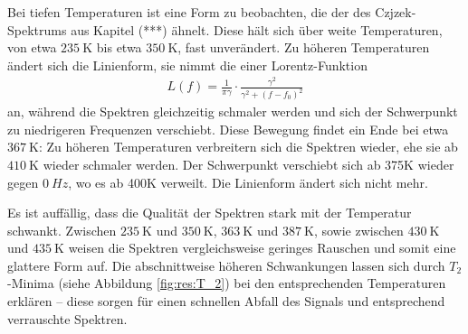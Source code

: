 Bei tiefen Temperaturen ist eine Form zu beobachten, die der des Czjzek-Spektrums aus Kapitel (***) ähnelt. Diese hält sich über weite Temperaturen, von etwa $\SI{235}{\kelvin}$ bis etwa $\SI{350}{\kelvin}$, fast unverändert. Zu höheren Temperaturen ändert sich die Linienform, sie nimmt die einer Lorentz-Funktion
\begin{align}
	L(f) = \frac{1}{\pi \gamma} \cdot \frac{\gamma^2}{\gamma^2 + (f - f_0)^2} \label{eqn:res:lorentz}
\end{align}
an, während die Spektren gleichzeitig schmaler werden und sich der Schwerpunkt zu niedrigeren Frequenzen verschiebt. Diese Bewegung findet ein Ende bei etwa $\SI{367}{\kelvin}$: Zu höheren Temperaturen verbreitern sich die Spektren wieder, ehe sie ab $\SI{410}{\kelvin}$ wieder schmaler werden. Der Schwerpunkt verschiebt sich ab 375K wieder gegen $\SI{0}{Hz}$, wo es ab 400K verweilt. Die Linienform ändert sich nicht mehr.

Es ist auffällig, dass die Qualität der Spektren stark mit der Temperatur schwankt. Zwischen $\SI{235}{\kelvin}$ und $\SI{350}{\kelvin}$, $\SI{363}{\kelvin}$ und $\SI{387}{\kelvin}$, sowie zwischen $\SI{430}{\kelvin}$ und $\SI{435}{\kelvin}$ weisen die Spektren vergleichsweise geringes Rauschen und somit eine glattere Form auf. Die abschnittweise höheren Schwankungen lassen sich durch $T_2$-Minima (siehe Abbildung \ref{fig:res:T_2}) bei den entsprechenden Temperaturen erklären -- diese sorgen für einen schnellen Abfall des Signals und entsprechend verrauschte Spektren.

